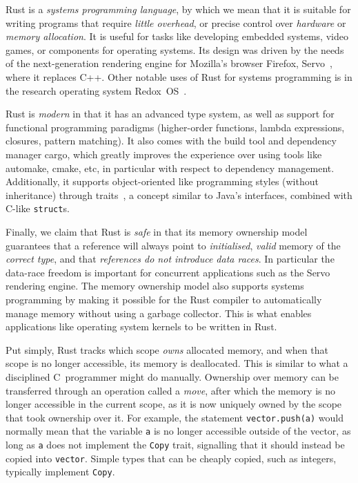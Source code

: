 \documentclass[11pt,a4paper,twoside,openany,draft]{report}
\newcommand{\InRust}[1]{\texttt{#1}}
\begin{document}
Rust is a \textit{systems programming language}, by which we mean that it is
suitable for writing programs that require \textit{little overhead}, or precise
control over \textit{hardware} or \textit{memory allocation}. It is useful for
tasks like developing embedded systems, video games, or components for operating
systems. Its design was driven by the needs of the next-generation rendering
engine for Mozilla's browser Firefox, Servo~\cite{anderson2016engineering},
where it replaces C++. Other notable uses of Rust for systems programming is in
the research operating system Redox~OS~\cite{redox}.

Rust is \textit{modern} in that it has an advanced type system, as well as
support for functional programming paradigms (higher-order functions, lambda
expressions, closures, pattern matching). It also comes with the build tool and
dependency manager cargo, which greatly improves the experience over using tools
like automake, cmake, etc, in particular with respect to dependency management.
Additionally, it supports object-oriented like programming styles (without
inheritance) through traits~\cite{scharli2003traits}, a concept similar to
Java's interfaces, combined with C-like \InRust{struct}s.

Finally, we claim that Rust is \textit{safe} in that its memory ownership model
guarantees that a reference will always point to \textit{initialised},
\textit{valid} memory of the \textit{correct type}, and that \textit{references
  do not introduce data races}. In particular the data-race freedom is important
for concurrent applications such as the Servo rendering engine. The memory
ownership model also supports systems programming by making it possible for the
Rust compiler to automatically manage memory without using a garbage collector.
This is what enables applications like operating system kernels to be written in
Rust.

Put simply, Rust tracks which scope \textit{owns} allocated memory, and when
that scope is no longer accessible, its memory is deallocated. This is similar
to what a disciplined C~programmer might do manually. Ownership over memory can
be transferred through an operation called a \textit{move}, after which the
memory is no longer accessible in the current scope, as it is now uniquely owned
by the scope that took ownership over it. For example, the statement
\InRust{vector.push(a)} would normally mean that the variable \InRust{a} is no
longer accessible outside of the vector, as long as \InRust{a} does not
implement the \InRust{Copy} trait, signalling that it should instead be copied
into \InRust{vector}. Simple types that can be cheaply copied, such as integers,
typically implement \InRust{Copy}.
\end{document}
